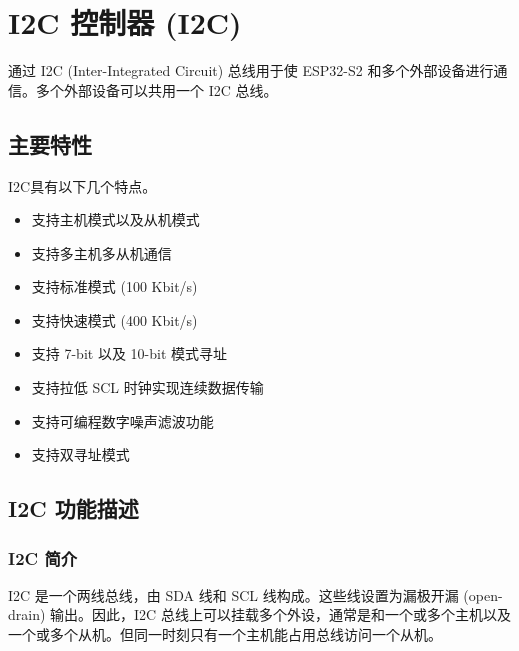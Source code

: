 \documentclass[main\_\_CN.tex]{subfiles}
\begin{document}
\setchineseformatting

\ifglobal
\else
    {\let\clearpage\relax \listoftodos}
    {\let\clearpage\relax \listofdonetodos}
    \tableofcontents
\fi




\hypertarget{i2c}{}
\chapter{I2C 控制器 (I2C)}
\label{mod:i2c}

\chipname{} 通过 I2C (Inter-Integrated Circuit) 总线用于使 ESP32-S2 和多个外部设备进行通信。多个外部设备可以共用一个 I2C 总线。

\section{主要特性}

I2C具有以下几个特点。

\begin{itemize}
    \item 支持主机模式以及从机模式
    \item 支持多主机多从机通信
    \item 支持标准模式 (100 Kbit/s)
    \item 支持快速模式 (400 Kbit/s)
    \item 支持 7-bit 以及 10-bit 模式寻址
    \item 支持拉低 SCL 时钟实现连续数据传输
    \item 支持可编程数字噪声滤波功能
    \item 支持双寻址模式
\end{itemize}

\section{\texorpdfstring{I2C 功能描述}{I2C 功能描述}}

\subsection{\texorpdfstring{I2C 简介}{I2C 简介}}
I2C 是一个两线总线，由 SDA 线和 SCL 线构成。这些线设置为漏极开漏 (open-drain) 输出。因此，I2C 总线上可以挂载多个外设，通常是和一个或多个主机以及一个或多个从机。但同一时刻只有一个主机能占用总线访问一个从机。
\end{document}
